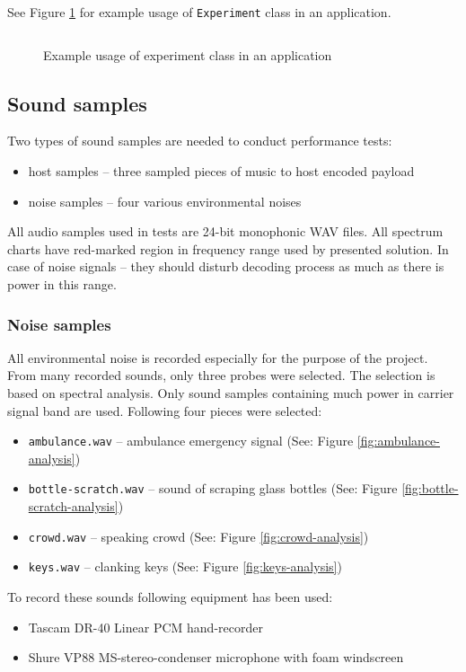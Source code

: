 See Figure \ref{fig:experiment-application} for example usage of \verb|Experiment| class in an application.
\begin{figure}[h]
  \centering
  \inputminted[linenos]{python}{listings/experiment_example.py}
  \caption{Example usage of experiment class in an application}
  \label{fig:experiment-application}
\end{figure}

\subsection{Sound samples}
\label{subsec:sound-samples}
Two types of sound samples are needed to conduct performance tests:
\begin{itemize}
  \item host samples -- three sampled pieces of music to host encoded payload
  \item noise samples -- four various environmental noises
\end{itemize}
All audio samples used in tests are 24-bit monophonic WAV files. All spectrum charts have red-marked region in frequency range
used by presented solution. In case of noise signals -- they should disturb decoding process as much as there is power in this range.

\subsubsection{Noise samples}
All environmental noise is recorded especially for the purpose of the project. From many recorded sounds, only
three probes were selected. The selection is based on spectral analysis. Only sound samples containing much power in carrier signal
band are used.
Following four pieces were selected:
\begin{itemize}
  \item \verb|ambulance.wav| -- ambulance emergency signal (See: Figure \ref{fig:ambulance-analysis})
  \item \verb|bottle-scratch.wav| -- sound of scraping glass bottles (See: Figure \ref{fig:bottle-scratch-analysis})
  \item \verb|crowd.wav| -- speaking crowd (See: Figure \ref{fig:crowd-analysis})
  \item \verb|keys.wav| -- clanking keys (See: Figure \ref{fig:keys-analysis})
\end{itemize}


\noindent To record these sounds following equipment has been used:
\begin{itemize}
  \item Tascam DR-40 Linear PCM hand-recorder
  \item Shure VP88 MS-stereo-condenser microphone with foam windscreen
\end{itemize}

